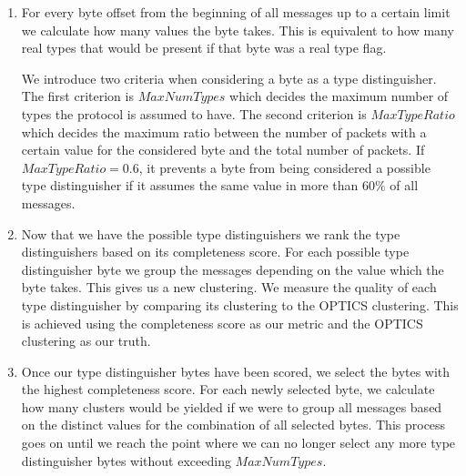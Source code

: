 \documentclass[a4paper]{report}
\begin{document}
\begin{enumerate}
    \item For every byte offset from the beginning of all messages up to a
    certain limit we calculate how many values the byte takes. This is equivalent
    to how many real types that would be present if that byte was a real
    type flag.

    We introduce two criteria when considering a byte as a type distinguisher.
    The first criterion is $MaxNumTypes$ which decides the maximum number of
    types the protocol is assumed to have. The second criterion is
    $MaxTypeRatio$ which decides the maximum ratio between the number of packets
    with a certain value for the considered byte and the total number of
    packets. If $MaxTypeRatio = 0.6$, it prevents a byte from being considered
    a possible type distinguisher if it assumes the same value in more than
    $60\%$ of all messages.

    \item Now that we have the possible type distinguishers we rank the type
    distinguishers based on its completeness score. For each possible type
    distinguisher byte we group the messages depending on the value which the
    byte takes. This gives us a new clustering. We measure the quality of each
    type distinguisher by comparing its clustering to the OPTICS clustering.
    This is achieved using the completeness score as our metric and the OPTICS
    clustering as our truth.

    \item Once our type distinguisher bytes have been scored, we select the bytes
    with the highest completeness score. For each newly selected byte, we calculate
    how many clusters would be yielded if we were to group all messages based on
    the distinct values for the combination of all selected bytes. This process
    goes on until we reach the point where we can no longer select any more
    type distinguisher bytes without exceeding $MaxNumTypes$.
\end{enumerate}
\end{document}
